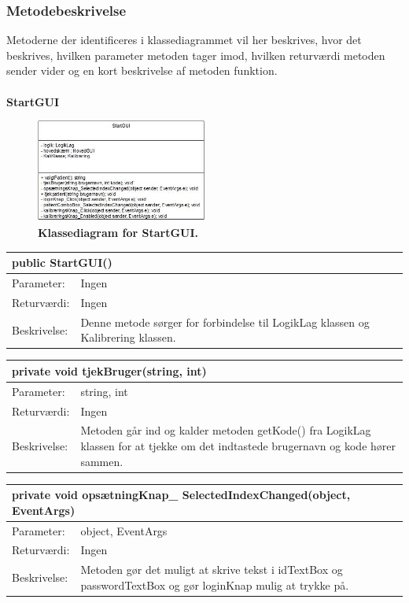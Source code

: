 \subsubsection{Metodebeskrivelse}
Metoderne der identificeres i klassediagrammet vil her beskrives, hvor det beskrives, hvilken parameter metoden tager imod, hvilken returværdi metoden sender vider og en kort beskrivelse af metoden funktion. \\\\
\textbf{StartGUI}
\begin{figure}[H]
\includegraphics[width =0.5\textwidth , center]{billeder/klassediagramStart}
\caption{\textbf{Klassediagram for StartGUI.}}
\end{figure}
\begin{table}[H]
\label{tab:tabel2}
\begin{tabular}{| l | p{13cm} |}
   \hline
   \multicolumn{2}{|l|}{public StartGUI()} \\ \hline
   Parameter: & Ingen\\ \hline
   Returværdi: & Ingen \\ \hline
   Beskrivelse: & Denne metode sørger for forbindelse til LogikLag klassen og Kalibrering klassen.\\ \hline
\end{tabular}
\end{table}
\begin{table}[H]
\label{tab:tabel2}
\begin{tabular}{| l | p{13cm} |}
   \hline
   \multicolumn{2}{|l|}{private void tjekBruger(string, int)} \\ \hline
   Parameter: & string, int\\ \hline
   Returværdi: & Ingen \\ \hline
   Beskrivelse: & Metoden går ind og kalder metoden getKode() fra LogikLag klassen for at tjekke om det indtastede brugernavn og kode hører sammen.\\ \hline
\end{tabular}
\end{table}
\begin{table}[H]
\label{tab:tabel2}
\begin{tabular}{| l | p{13cm} |}
   \hline
   \multicolumn{2}{|l|}{private void opsætningKnap\_ SelectedIndexChanged(object, EventArgs)} \\ \hline
   Parameter: & object, EventArgs\\ \hline
   Returværdi: & Ingen \\ \hline
   Beskrivelse: & Metoden gør det muligt at skrive tekst i idTextBox og passwordTextBox og gør loginKnap mulig at trykke på.\\ \hline
\end{tabular}
\end{table}
